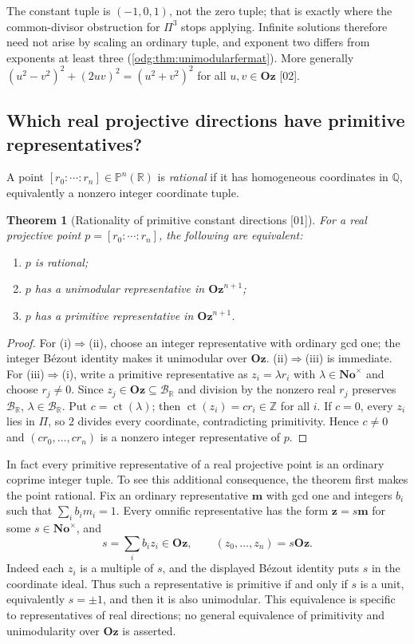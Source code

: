 \documentclass[11pt,oneside]{article}
\numberwithin{equation}{section}
\newtheorem{theorem}{Theorem}[section]
\theoremstyle{definition}
\theoremstyle{remark}
\newcommand{\No}{\mathbf{No}}
\newcommand{\Oz}{\mathbf{Oz}}
\newcommand{\Z}{\mathbb Z}
\newcommand{\Q}{\mathbb Q}
\newcommand{\R}{\mathbb R}
\newcommand{\BR}{\mathcal B_{\R}}
\newcommand{\ct}{\operatorname{ct}}
\newcommand{\src}[1]{\textup{\textsf{\small[#1]}}}
\begin{document}
The constant tuple is $(-1,0,1)$, not the zero tuple; that is exactly where
the common-divisor obstruction for $\Pi^3$ stops applying. Infinite
solutions therefore need not arise by scaling an ordinary tuple, and
exponent two differs from exponents at least three
(\cref{odg:thm:unimodularfermat}). More generally
$(u^2-v^2)^2+(2uv)^2=(u^2+v^2)^2$ for all $u,v\in\Oz$ \src{02}.

\subsection{Which real projective directions have primitive representatives?}

A point $[r_0:\cdots:r_n]\in\mathbb P^n(\R)$ is \emph{rational} if
it has homogeneous coordinates in $\Q$, equivalently a nonzero integer
coordinate tuple.

\begin{theorem}[Rationality of primitive constant directions \src{01}]\label{odg:thm:realray}
For a real projective point $p=[r_0:\cdots:r_n]$, the following are
equivalent:
\begin{enumerate}[label=\textup{(\roman*)},leftmargin=*]
\item $p$ is rational;
\item $p$ has a unimodular representative in $\Oz^{n+1}$;
\item $p$ has a primitive representative in $\Oz^{n+1}$.
\end{enumerate}
\end{theorem}
\begin{proof}
For (i)$\Rightarrow$(ii), choose an integer representative with ordinary gcd
one; the integer B\'ezout identity makes it unimodular over $\Oz$.
(ii)$\Rightarrow$(iii) is immediate. For (iii)$\Rightarrow$(i), write a
primitive representative as $z_i=\lambda r_i$ with $\lambda\in\No^\times$
and choose $r_j\ne0$. Since $z_j\in\Oz\subseteq\BR$ and division by the
nonzero real $r_j$ preserves $\BR$, $\lambda\in\BR$. Put $c=\ct(\lambda)$;
then $\ct(z_i)=cr_i\in\Z$ for all $i$. If $c=0$, every $z_i$ lies in $\Pi$,
so $2$ divides every coordinate, contradicting primitivity. Hence $c\ne0$ and
$(cr_0,\ldots,cr_n)$ is a nonzero integer representative of $p$.
\end{proof}

In fact every primitive representative of a real projective point is an
ordinary coprime integer tuple. To see this additional consequence, the
theorem first makes the point rational. Fix an ordinary representative
$\mathbf m$ with gcd one and integers $b_i$ such that $\sum_i b_i m_i=1$.
Every omnific representative has the form $\mathbf z=s\mathbf m$ for some
$s\in\No^\times$, and
\[
 s=\sum_i b_i z_i\in\Oz,\qquad
 (z_0,\ldots,z_n)=s\Oz.
\]
Indeed each $z_i$ is a multiple of $s$, and the displayed B\'ezout identity
puts $s$ in the coordinate ideal. Thus such a representative is primitive
if and only if $s$ is a unit, equivalently $s=\pm1$, and then it is also
unimodular. This equivalence is specific to representatives of real
directions; no general equivalence of primitivity and unimodularity over
$\Oz$ is asserted.
\end{document}
